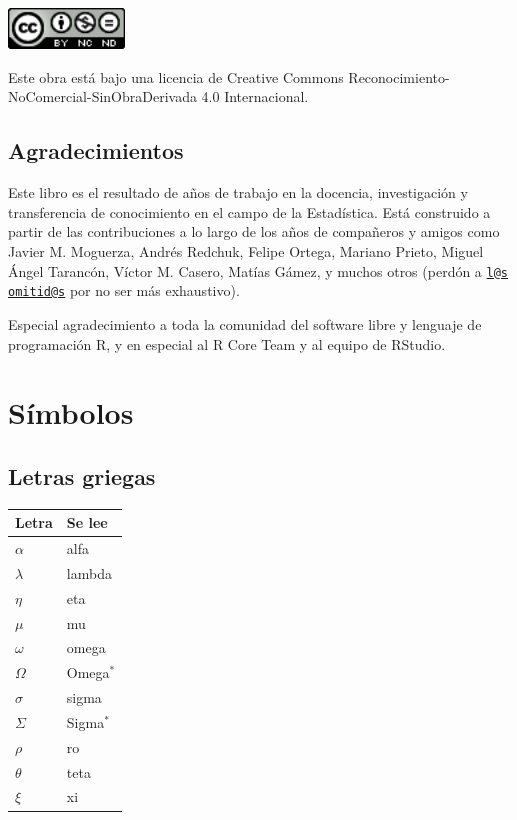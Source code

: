 \documentclass[
]{book}
\begin{document}
\includegraphics[width=1.22in]{images/by-nc-nd}

Este obra está bajo una licencia de Creative Commons Reconocimiento-NoComercial-SinObraDerivada 4.0 Internacional.

\hypertarget{agradecimientos}{%
\section*{Agradecimientos}\label{agradecimientos}}

Este libro es el resultado de años de trabajo en la docencia, investigación
y transferencia de conocimiento en el campo de la Estadística. Está construido
a partir de las contribuciones a lo largo de los años de compañeros y amigos
como Javier M. Moguerza, Andrés Redchuk, Felipe Ortega, Mariano Prieto,
Miguel Ángel Tarancón, Víctor M. Casero, Matías Gámez, y muchos otros (perdón
a \href{mailto:l@s}{\nolinkurl{l@s}} \href{mailto:omitid@s}{\nolinkurl{omitid@s}} por no ser más exhaustivo).

Especial agradecimiento a toda la comunidad del software libre y
lenguaje de programación R, y en especial al R Core Team y al equipo
de RStudio.

\hypertarget{appendix-apuxe9ndices}{%
\appendix}


\hypertarget{suxedmbolos}{%
\chapter{Símbolos}\label{suxedmbolos}}

\hypertarget{letras-griegas}{%
\section{Letras griegas}\label{letras-griegas}}

\begin{longtable}[]{@{}ll@{}}
\toprule
Letra & Se lee \\
\midrule
\endhead
\(\alpha\) & alfa \\
\(\lambda\) & lambda \\
\(\eta\) & eta \\
\(\mu\) & mu \\
\(\omega\) & omega \\
\(\Omega\) & Omega\(^*\) \\
\(\sigma\) & sigma \\
\(\Sigma\) & Sigma\(^*\) \\
\(\rho\) & ro \\
\(\theta\) & teta \\
\(\xi\) & xi \\
\bottomrule
\end{longtable}
\end{document}

